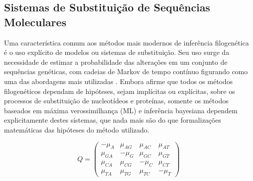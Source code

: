 \documentclass[english,brazilian]{UNISINOSmonografia} %
\begin{document}
\subsection{Sistemas de Substituição de Sequências Moleculares}
\label{sec:modelos-de-substituicao}

%
%


Uma característica comum aos métodos mais modernos de inferência filogenética é o uso explícito de modelos ou sistemas de substituição.
Seu uso surge da necessidade de estimar a probabilidade das alterações em um conjunto de sequências genéticas, com cadeias de Markov de tempo contínuo figurando como uma das abordagens mais utilizadas \cite{yang2014molecular}.
Embora  afirme que todos os métodos filogenéticos dependam de hipóteses, sejam implícitas ou explícitas, sobre os processos de substituição de nucleotídeos e proteínas, somente os métodos baseados em máxima verossimilhança (ML) e inferência bayesiana dependem explicitamente destes sistemas, que nada mais são do que formalizações matemáticas das hipóteses do método utilizado.


\begin{equation}
\label{eq:markovdna}
Q = \begin{pmatrix}
-\mu_A & \mu_{AG} & \mu_{AC} & \mu_{AT} \\
\mu_{GA} & -\mu_G   & \mu_{GC} & \mu_{GT} \\
\mu_{CA} & \mu_{CG} & -\mu_C   & \mu_{CT} \\
\mu_{TA} & \mu_{TG} & \mu_{TC} & -\mu_T 
\end{pmatrix}
\end{equation}
\end{document}
